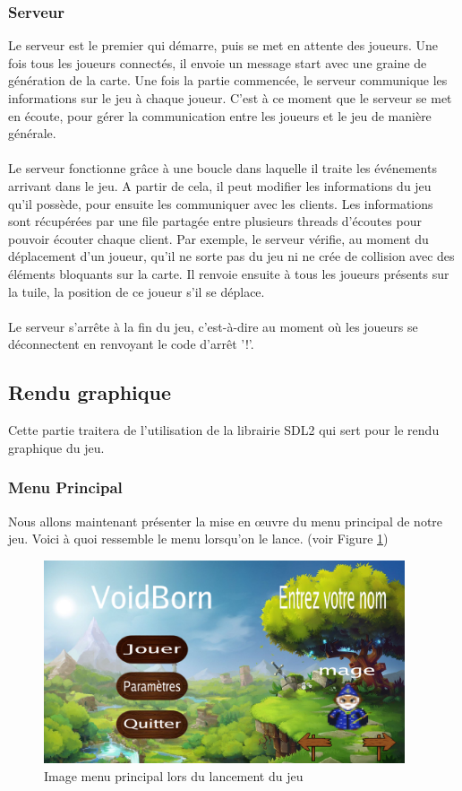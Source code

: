 \documentclass[11pt]{article}
\begin{document}
            \subsubsection{Serveur}
            Le serveur est le premier qui démarre, puis se met en attente des joueurs. Une fois tous les joueurs connectés, il envoie un message start avec une graine de génération de la carte. Une fois la partie commencée, le serveur communique les informations sur le jeu à chaque joueur. C’est à ce moment que le serveur se met en écoute, pour gérer la communication entre les joueurs et le jeu de manière générale.\\\\
            Le serveur fonctionne grâce à une boucle dans laquelle il traite les événements arrivant dans le jeu. A partir de cela, il peut modifier les informations du jeu qu’il possède, pour ensuite les communiquer avec les clients. Les informations sont récupérées par une file partagée entre plusieurs threads d’écoutes pour pouvoir écouter chaque client.
            Par exemple, le serveur vérifie, au moment du déplacement d’un joueur, qu’il ne sorte pas du jeu ni ne crée de collision avec des éléments bloquants sur la carte.
            Il renvoie ensuite à tous les joueurs présents sur la tuile, la position de ce joueur s'il se déplace.\\\\
            Le serveur s'arrête à la fin du jeu, c'est-à-dire au moment où les joueurs se déconnectent en renvoyant le code d'arrêt '!'.

        \subsection{Rendu graphique}
        Cette partie traitera de l'utilisation de la librairie SDL2 qui sert pour le rendu graphique du jeu.
            \subsubsection{Menu Principal}
            Nous allons maintenant présenter la mise en œuvre du menu principal de notre jeu. 
            Voici à quoi ressemble le menu lorsqu’on le lance. (voir Figure \ref{fig:mainMenu})
            \begin{figure}[H]
                \begin{center}
                    \includegraphics[height=6cm]{screenMenu.png}
                    \caption{Image menu principal lors du lancement du jeu}
                    \label{fig:mainMenu} 
                \end{center}
            \end{figure}
\end{document}
